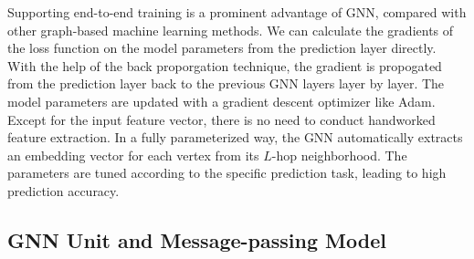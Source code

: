 Supporting end-to-end training is a prominent advantage of GNN, compared with other graph-based machine learning methods.
We can calculate the gradients of the loss function on the model parameters from the prediction layer directly.
With the help of the back proporgation technique, the gradient is propogated from the prediction layer back to the previous GNN layers layer by layer.
The model parameters are updated with a gradient descent optimizer like Adam.
Except for the input feature vector, there is no need to conduct handworked feature extraction.
In a fully parameterized way, the GNN automatically extracts an embedding vector for each vertex from its $L$-hop neighborhood.
The parameters are tuned according to the specific prediction task, leading to high prediction accuracy.

\subsection{GNN Unit and Message-passing Model}
